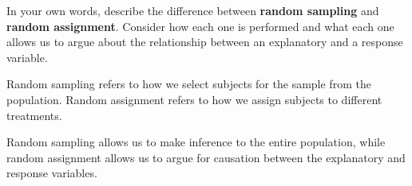 \documentclass[noanswers]{exam}
\begin{document}
\begin{questions}
	
	\question In your own words, describe the difference between \textbf{random sampling} and \textbf{random assignment}. Consider how each one is performed and what each one allows us to argue about the relationship between an explanatory and a response variable.
	
	\begin{solution}[\stretch{1}]
		
			\vspace{3mm}

			Random sampling refers to how we select subjects for the sample from the population. Random  assignment refers to how we assign subjects to different treatments. 
			
			\vspace{3mm}
			
			Random sampling allows us to make inference to the entire population, while random assignment allows us to argue for causation between the explanatory and response variables.
		
			\vspace{3mm}	
	

\end{solution}
\end{questions}
\end{document}
